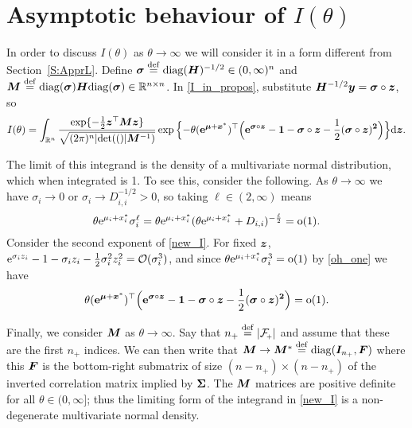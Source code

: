 \section{Asymptotic behaviour of $I(\theta)$}\label{S:Asympt}

In order to discuss $I(\theta)$ as $\theta \to \infty$ we will consider it in
a form different from Section~\ref{S:ApprL}. Define $ \bm{\sigma} \overset{\mathrm{def}}{=}
\mathrm{diag}(\bm{H})^{-1/2} \in (0,\infty)^n$ and $\bm{M} \overset{\mathrm{def}}{=}
\mathrm{diag}(\bm{\sigma}) \bm{H} \mathrm{diag}(\bm{\sigma}) \in \mathbb{R}^{n \times
  n}$.  In \eqref{I_in_propos}, substitute $\bm{H}^{-1/2} \bm{y} = \bm{\sigma} \circ \bm{z}$, so
\begin{equation} \label{new_I}
	I(\theta) = \int_{\mathbb{R}^n}
 \frac{\exp\{{-}\frac12 \bm{z}^\top \bm{M} \bm{z}\}}{\sqrt{(2\pi)^n\lvert \mathrm{det}(() \rvert\bm{M}^{-1})}}
	\exp\Big\{{-}\theta (\bm{\mathrm{e}}^{\bm{\mu} + \bm{x}^*})^\top
  \Big( \bm{\mathrm{e}}^{\bm{\sigma} \circ \bm{z}} - \bm{1} - \bm{\sigma} \circ \bm{z}
  - \frac12(\bm{\sigma} \circ \bm{z})^{\bm{2}} \Big)\Big\}\mathrm{d} \bm{z} .
\end{equation}

The limit of this integrand is the density of a multivariate normal
distribution, which when integrated is 1. To see this, consider the
following. As $\theta \to \infty$ we have $\sigma_i \to 0$ or $\sigma_i
\to D_{i,i}^{-1/2} > 0$, so taking $\ell \in (2,\infty)$ means
\begin{equation} \label{oh_one}
	\theta \mathrm{e}^{\mu_i + x_i^*} \sigma_i^\ell = \theta \mathrm{e}^{\mu_i + x_i^*}
  (\theta \mathrm{e}^{\mu_i + x_i^*} + D_{i,i})^{-\frac{\ell}{2}} = {\mathrm{o}}(1) .
\end{equation}
Consider the second exponent of \eqref{new_I}. For fixed $\bm{z}$,
$\mathrm{e}^{\sigma_i z_i} - 1 - \sigma_i z_i - \frac12 \sigma_i^2 z_i^2 =
{\mathcal{O}}(\sigma_i^3)$, and since $\theta \mathrm{e}^{\mu_i + x_i^*} \sigma_i^3 = {\mathrm{o}}(1)$
by \eqref{oh_one} we have
\begin{equation} \label{second_exp_to_zero}
	\theta (\bm{\mathrm{e}}^{\bm{\mu} + \bm{x}^*})^\top  \Big( \bm{\mathrm{e}}^{\bm{\sigma} \circ \bm{z}} - \bm{1}
   - \bm{\sigma} \circ \bm{z} - \frac12(\bm{\sigma} \circ \bm{z})^{\bm{2}} \Big) = {\mathrm{o}}(1) .
\end{equation}

Finally, we consider $\bm{M}$ as $\theta \to \infty$. Say that $n_{+} \defeq
\abs{\Fset{+}}$ and assume that these are the first $n_{+}$ indices. We can then
write that $\bm{M} \to \bm{M}^* \overset{\mathrm{def}}{=} \mathrm{diag}(\bm{I}_{n_{+}}, \bm{F})$ where this
$\bm{F}$ is the bottom-right submatrix of size $(n-n_{+}) \times (n-n_{+})$ of
the inverted correlation matrix implied by $\bm{\Sigma}$. The $\bm{M}$ matrices are
positive definite for all $\theta\in(0,\infty]$; thus the limiting form of the
  integrand in \eqref{new_I} is a non-degenerate multivariate normal density.

